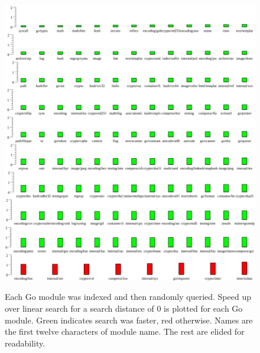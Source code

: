 \begin{figure}
    \includegraphics[width=\textwidth]{example0.png}
    \label{dist6plot}
    \centering
    \caption{Each Go module was indexed and then randomly queried.
    Speed up over linear search for a search distance of $0$ is plotted for each Go module.
    Green indicates search was faster, red otherwise.
    Names are the first twelve characters of module name.
    The rest are elided for readability.}
\end{figure}
